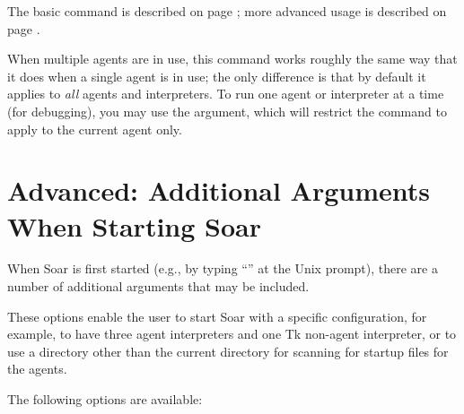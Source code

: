 {

The basic  command is described on page \pageref{run}; more advanced
usage is described on page \pageref{run2}.

When multiple agents are in use, this command works roughly the same way that
it does when a single agent is in use; the only difference is that by default
it applies to \textit{all} agents and interpreters. To run one agent or
interpreter at a time (for debugging), you may use the  argument,
which will restrict the  command to apply to the current agent only.

\subsection{ \soar{[-self]}}
\label{send}


\section{Advanced: Additional Arguments When Starting Soar}
\label{INTERFACE-advanced-soar}
\label{soar2}

When Soar is first started (e.g., by typing ``'' at the Unix
prompt), there are a number of additional arguments that may be included.

These options enable the user to start Soar with a specific configuration, for
example, to have three agent interpreters and one Tk non-agent interpreter, or
to use a directory other than the current directory for scanning for startup
files for the agents.

The following options are available:

}
